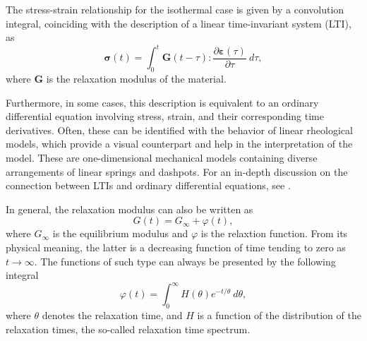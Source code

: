 The stress-strain relationship for the isothermal case is given by a convolution integral, coinciding with the description of a linear time-invariant system (LTI), as
\begin{equation}
\label{eq:stress_constitutive_infinitesimal_viscoelasticity}
	\bm \sigma(t) = \int_0^t \bm G(t-\tau):\frac{\partial \bm \varepsilon(\tau)}{\partial \tau}\ d\tau,
\end{equation}
where $\bm{G}$ is the relaxation modulus of the material.

Furthermore, in some cases, this description is equivalent to an ordinary differential equation involving stress, strain, and their corresponding time derivatives.
Often, these can be identified with the behavior of linear rheological models, which provide a visual counterpart and help in the interpretation of the model.
These are one-dimensional mechanical models containing diverse arrangements of linear springs and dashpots.
For an in-depth discussion on the connection between LTIs and ordinary differential equations, see \cite{ciampaLinearDifferentialEquations2019}.

In general, the relaxation modulus can also be written as \citep{malkinRheologyConceptsMethods2017}
\begin{equation}
\label{eq:relax_mod_decomp}
	G(t) = G_\infty + \varphi(t),
\end{equation}
where $G_\infty$ is the equilibrium modulus and $\varphi$ is the relaxtion function.
From its physical meaning, the latter is a decreasing function of time tending to zero as $t\to\infty$.
The functions of such type can always be presented by the following integral
\begin{equation}
  \label{eq:relax_time_spectrum}
	\varphi(t) = \int_0^\infty H(\theta) e^{-t/\theta}\ d\theta,
\end{equation}
where $\theta$ denotes the relaxation time, and $H$ is a function of the distribution of the relaxation times, the so-called relaxation time spectrum.

